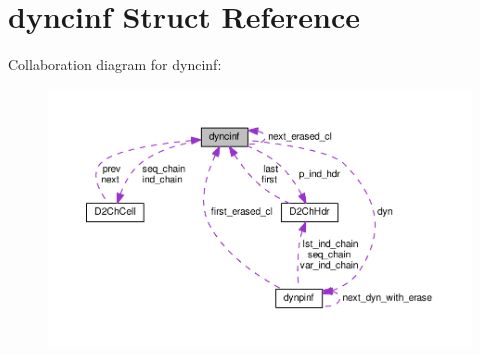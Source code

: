 \hypertarget{structdyncinf}{}\section{dyncinf Struct Reference}
\label{structdyncinf}


Collaboration diagram for dyncinf\+:\nopagebreak
\begin{figure}[H]
\begin{center}
\leavevmode
\includegraphics[width=350pt]{structdyncinf__coll__graph}
\end{center}
\end{figure}
